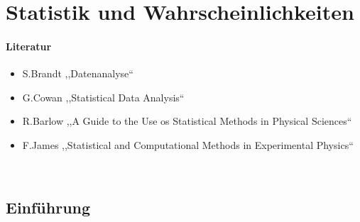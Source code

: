\chapter{Statistik und Wahrscheinlichkeiten}

\subsubsection{Literatur}

\begin{itemize}
	\item S.Brandt ,,Datenanalyse``
	\item G.Cowan ,,Statistical Data Analysis``
	\item R.Barlow ,,A Guide to the Use os Statistical Methods in Physical Sciences``
	\item F.James ,,Statistical and Computational Methods in Experimental Physics``
\end{itemize}
\\

\section{Einführung}

